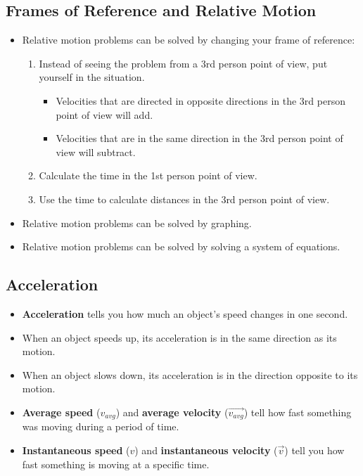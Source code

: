 \documentclass[letterpaper, 12pt]{article}
\begin{document}
\subsection*{Frames of Reference and Relative Motion}
\begin{itemize}
	\item Relative motion problems can be solved by changing your frame of reference:
		\begin{enumerate} 
			\item Instead of seeing the problem from a 3rd person point of view, put yourself in the situation.
				\begin{itemize}
					\item Velocities that are directed in opposite directions in the 3rd person point of view will add.
					\item Velocities that are in the same direction in the 3rd person point of view will subtract.
				\end{itemize}
			\item Calculate the time in the 1st person point of view.
			\item Use the time to calculate distances in the 3rd person point of view.
			
		\end{enumerate}
	\item Relative motion problems can be solved by graphing.
	\item Relative motion problems can be solved by solving a system of equations.
	
	
\end{itemize}

	
\subsection*{Acceleration}
\begin{itemize}
	\item \textbf{Acceleration} tells you how much an object's speed changes in one second.
	\item When an object speeds up, its acceleration is in the same direction as its motion.
	\item When an object slows down, its acceleration is in the direction  opposite to its motion.
	\item \textbf{Average speed} ($v_{avg}$) and \textbf{average velocity} ($\vec{v_{avg}}$) tell how fast something was moving during a period of time.
	\item \textbf{Instantaneous speed} ($v$) and \textbf{instantaneous velocity} ($\vec{v}$) tell you how fast something is moving at a specific time.
	
\end{itemize}
\end{document}
